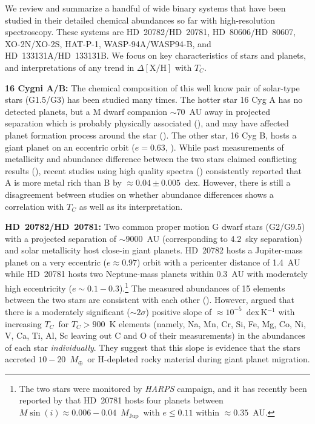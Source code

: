 \documentclass[modern, letterpaper]{aastex61}
\newcommand{\project}[1]{\textsl{#1}}
\newcommand*\elem[1]{\ensuremath{\mathrm{#1}}}
\newcommand*\elemH[1]{\ensuremath{[\mathrm{#1}/\elem{H}]}}
\newcommand{\Tcondens}{\ensuremath{T_C}}
\newcommand{\mearth}{\ensuremath{M_\oplus}}
\newcommand{\mjupiter}{\ensuremath{M_\mathrm{Jup}}}
\begin{document}
We review and summarize a handful of
wide binary systems that have been studied in their detailed chemical
abundances so far with high-resolution spectroscopy.
These systems are HD~20782/HD~20781, HD~80606/HD~80607, XO-2N/XO-2S, HAT-P-1,
WASP-94A/WASP94-B, and HD~133131A/HD~133131B.
We focus on key characteristics of stars and planets, and interpretations of
any trend in $\Delta\elemH{X}$ with \Tcondens.

{\bf 16 Cygni A/B:}
The chemical composition of this well know pair of solar-type stars (G1.5/G3)
has been studied many times.
The hotter star 16 Cyg A has no detected planets, but a M dwarf companion $\sim
70$~AU away in projected separation which is probably physically associated
(\citealt{2002ApJ...581..654P}), and may have affected planet formation process
around the star (\citealt{1996ApJ...458..312J,2005MNRAS.363..641M}).
The other star, 16 Cyg B, hosts a giant planet on an eccentric orbit ($e=0.63$,
\citealt{1997ApJ...483..457C}).
While past measurements of metallicity and abundance difference between the two
stars claimed conflicting results
(\citealt{2001ApJ...553..405L,2011ApJ...737L..32S}), recent studies using high
quality spectra (\citealt{2011ApJ...740...76R,2014ApJ...790L..25T})
consistently reported that A is more metal rich than B by $\approx 0.04 \pm
0.005$~dex.
However, there is still a disagreement between studies on
whether abundance differences shows a correlation with $\Tcondens$ as well as
its interpretation.

{\bf HD~20782/HD~20781:}
Two common proper motion G dwarf stars (G2/G9.5) with a projected separation of
$\sim9000$~AU (corresponding to 4.2\arcmin\ sky separation) and solar metallicity
host close-in giant planets.
HD~20782 hosts a Jupiter-mass planet on a very eccentric ($e\approx 0.97$)
orbit with a pericenter distance of 1.4~AU while HD~20781 hosts two
Neptune-mass planets within 0.3~AU with moderately high eccentricity
($e\sim0.1-0.3$).\footnote{
  The two stars were monitored by \project{HARPS} campaign, and it has recently
  been reported by \citealt{2017arXiv170505153U} that HD~20781 hosts four
  planets between $M\sin(i)\approx 0.006-0.04$~\mjupiter\ with $e \le 0.11$
  within $\approx 0.35$~AU.}
The measured abundances of 15 elements between the two stars are consistent
with each other (\citealt{Mack:2014aa}).
However, \citealt{Mack:2014aa} argued that there is a moderately significant
($\sim 2\sigma$) positive slope of $\approx 10^{-5}$~dex\,K$^{-1}$ with
increasing \Tcondens\ for $\Tcondens>900$~K elements (namely, Na, Mn, Cr, Si,
Fe, Mg, Co, Ni, V, Ca, Ti, Al, Sc leaving out C and O of their measurements) in
the abundances of each star {\it individually}.
They suggest that this slope is evidence that the stars accreted
$10-20$~\mearth\ or \elem{H}-depleted rocky material during giant planet
migration.
\end{document}

